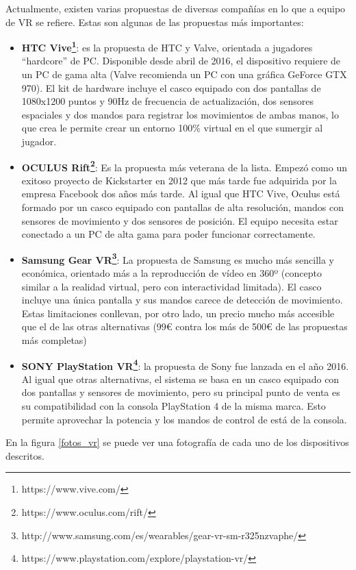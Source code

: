 Actualmente, existen varias propuestas de diversas compañías en lo que a equipo de VR se refiere. Estas son algunas de las propuestas más importantes:
\begin{itemize}
\item \textbf{HTC Vive\footnote{https://www.vive.com/}}: es la propuesta de HTC y Valve, orientada a jugadores ``hardcore'' de PC. Disponible desde abril de 2016, el dispositivo requiere de un PC de gama alta (Valve recomienda un PC con una gráfica GeForce GTX 970). El kit de hardware incluye el casco equipado con dos pantallas de 1080x1200 puntos y 90Hz de frecuencia de actualización, dos sensores espaciales y dos mandos para registrar los movimientos de ambas manos, lo que crea le permite crear un entorno 100\% virtual en el que sumergir al jugador.

\item \textbf{OCULUS Rift\footnote{https://www.oculus.com/rift/}}: Es la propuesta más veterana de la lista. Empezó como un exitoso proyecto de Kickstarter en 2012 que más tarde fue adquirida por la empresa Facebook dos años más tarde. Al igual que HTC Vive, Oculus está formado por un casco equipado con pantallas de alta resolución, mandos con sensores de movimiento y dos sensores de posición. El equipo necesita estar conectado a un PC de alta gama para poder funcionar correctamente.

\item \textbf{Samsung Gear VR\footnote{http://www.samsung.com/es/wearables/gear-vr-sm-r325nzvaphe/}}: La propuesta de Samsung es mucho más sencilla y económica, orientado más a la reproducción de vídeo en 360º (concepto similar a la realidad virtual, pero con interactividad limitada). El casco incluye una única pantalla y sus mandos carece de detección de movimiento. Estas limitaciones conllevan, por otro lado, un precio mucho más accesible que el de las otras alternativas (99€ contra los más de 500€ de las propuestas más completas)

\item \textbf{SONY PlayStation VR\footnote{https://www.playstation.com/explore/playstation-vr/}}: la propuesta de Sony fue lanzada en el año 2016. Al igual que otras alternativas, el sistema se basa en un casco equipado con dos pantallas y sensores de movimiento, pero su principal punto de venta es su compatibilidad con la consola PlayStation 4 de la misma marca. Esto permite aprovechar la potencia y los mandos de control de está de la consola.
\end{itemize}
En la figura \ref{fotos_vr} se puede ver una fotografía de cada uno de los dispositivos descritos.
